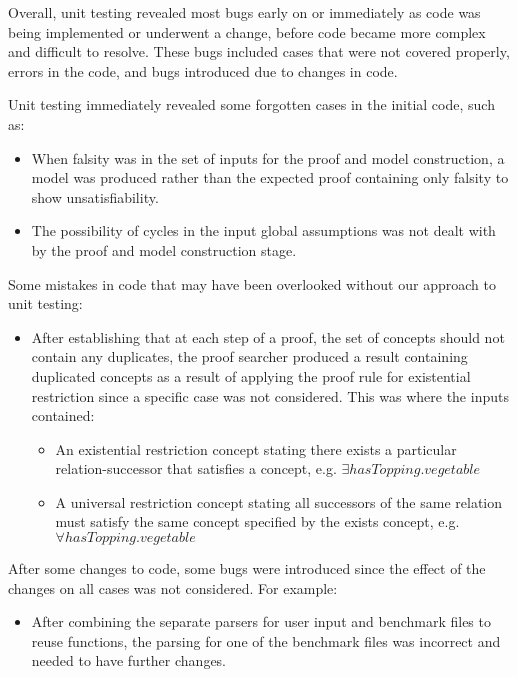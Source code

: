 Overall, unit testing revealed most bugs early on or immediately as code was being implemented or underwent a change, before code became more complex and difficult to resolve. These bugs included cases that were not covered properly, errors in the code, and bugs introduced due to changes in code.

Unit testing immediately revealed some forgotten cases in the initial code, such as:

\begin{itemize}
\item When falsity was in the set of inputs for the proof and model construction, a model was produced rather than the expected proof containing only falsity to show unsatisfiability.
\item The possibility of cycles in the input global assumptions was not dealt with by the proof and model construction stage.
\end{itemize}

Some mistakes in code that may have been overlooked without our approach to unit testing:

\begin{itemize}
\item After establishing that at each step of a proof, the set of concepts should not contain any duplicates, the proof searcher produced a result containing duplicated concepts as a result of applying the proof rule for existential restriction since a specific case was not considered. This was where the inputs contained:
\begin{itemize}
\item An existential restriction concept stating there exists a particular relation-successor that satisfies a concept, e.g. $\exists hasTopping . vegetable $
\item A universal restriction concept stating all successors of the same relation must satisfy the same concept specified by the exists concept, e.g. $ \forall hasTopping . vegetable $
\end{itemize}
\end{itemize}

After some changes to code, some bugs were introduced since the effect of the changes on all cases was not considered. For example:

\begin{itemize}
\item After combining the separate parsers for user input and benchmark files to reuse functions, the parsing for one of the benchmark files was incorrect and needed to have further changes.
\end{itemize}


